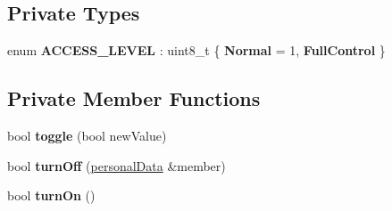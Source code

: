 \subsection*{Private Types}
\begin{DoxyCompactItemize}
\item 
\mbox{\label{classalarm_a06b1f88d7b539ae0a46c30d970222687}} 
enum {\bfseries A\+C\+C\+E\+S\+S\+\_\+\+L\+E\+V\+EL} \+: uint8\+\_\+t \{ {\bfseries Normal} = 1, 
{\bfseries Full\+Control}
 \}
\end{DoxyCompactItemize}
\subsection*{Private Member Functions}
\begin{DoxyCompactItemize}
\item 
\mbox{\label{classalarm_a0fed4e17af71e422087f61cb2a7443ca}} 
bool {\bfseries toggle} (bool new\+Value)
\item 
\mbox{\label{classalarm_a66a4c7e43f89bfb0c6a0f03f5531d01b}} 
bool {\bfseries turn\+Off} (\mbox{\hyperlink{structpersonal_data}{personal\+Data}} \&member)
\item 
\mbox{\label{classalarm_ac6de3c71489d640032d41fd50c1e041c}} 
bool {\bfseries turn\+On} ()
\end{DoxyCompactItemize}
